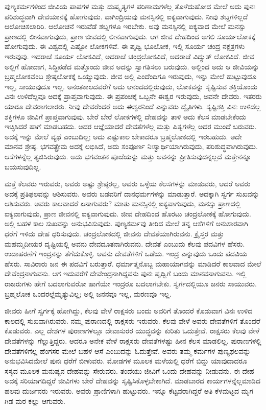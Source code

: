 ಪುಣ್ಯಕರ್ಮಗಳಿಂದ ಜೀವಿಯ ಪಾಪಗಳ ಮತ್ತು ದುಷ್ಕೃತ್ಯಗಳ ಪರಿಣಾಮಗಳೆಲ್ಲ ತೊಳೆದುಹೋದ ಮೇಲೆ ಅದು ಪುನಃ ಪರಿಶುದ್ಧವಾಗಿ ದೇವಯಾನಕ್ಕೆ ಹೋಗುವುದು. ವಾಗಿಂದ್ರಿಯವು ಮನಸ್ಸಿನಲ್ಲಿ ಐಕ್ಯವಾಗುವುದು. ನೀವು ಶಬ್ದಗಳಿಲ್ಲದೆ ಆಲೋಚಿಸಲಾರಿರಿ. ಆಲೋಚನೆ ಇರುವೆಡೆ ಶಬ್ದಗಳೂ ಇರಬೇಕು. ಅವು ಮನಸ್ಸಿನಲ್ಲಿ ಐಕ್ಯವಾದ ಮೇಲೆ ಮನಸ್ಸು ಪ್ರಾಣದಲ್ಲಿ ಲೀನವಾಗುವುದು, ಪ್ರಾಣ ಜೀವದಲ್ಲಿ ಲೀನವಾಗುವುದು. ಆಗ ಜೀವ ದೇಹದಿಂದ ಅಗಲಿ ಸೂರ್ಯಲೋಕಕ್ಕೆ ಹೋಗುವುದು. ಈ ವಿಶ್ವದಲ್ಲಿ ಎಷ್ಟೋ ಲೋಕಗಳಿವೆ. ಈ ಪೃಥ್ವಿ ಭೂಲೋಕ, ಇಲ್ಲಿ ಸೂರ್ಯ ಚಂದ್ರ ನಕ್ಷತ್ರಗಳು ಇರುವುವು. ಇದರಾಚೆ ಸೂರ್ಯ ಲೋಕವಿದೆ, ಅದರಾಚೆ ಚಂದ್ರಲೋಕವಿದೆ, ಅದರಾಚೆ ವಿದ್ಯುತ್​ ಲೋಕವಿದೆ. ಜೀವ ಅಲ್ಲಿಗೆ ಹೋದಾಗ, ಸಿದ್ಧಿಪಡೆದ ಮತ್ತೊಂದು ಜೀವ ಅದನ್ನು ಸ್ವಾಗತಿಸಲು ಬರುವುದು. ಅಲ್ಲಿಂದ ಅದು ಆ ಜೀವಿಯನ್ನು ಬ್ರಹ್ಮಲೋಕವೆಂಬ ಶ್ರೇಷ್ಠಲೋಕಕ್ಕೆ ಒಯ್ಯುವುದು. ಜೀವ ಅಲ್ಲಿ ಎಂದೆಂದಿಗೂ ಇರುವುದು, ಇನ್ನು ಮೇಲೆ ಹುಟ್ಟುವುದೂ ಇಲ್ಲ, ಸಾಯುವುದೂ ಇಲ್ಲ. ಅನಂತಕಾಲದವರೆಗೆ ಅದು ಆನಂದದಲ್ಲಿರುವುದು, ಲೋಕವನ್ನು ಸೃಷ್ಟಿಸುವ ಶಕ್ತಿಯೊಂದು ವಿನಃ ಉಳಿದೆಲ್ಲವೂ ಅದಕ್ಕೆ ಪ್ರಾಪ್ತವಾಗುವುದು. ಈ ಪ್ರಪಂಚಕ್ಕೆ ಒಬ್ಬನೇ ಈಶ್ವರ ಇರುವುದು, ಅವನೇ ದೇವರು. ಇತರರು ಯಾರೂ ದೇವರಾಗಲಾರರು. ನೀವು ದೇವರೆಂದರೆ ಅದು ಈಶ್ವರನಿಂದೆ ಎನ್ನುವರು ದ್ವೈತಿಗಳು. ಸೃಷ್ಟಿಶಕ್ತಿ ವಿನಃ ಉಳಿದೆಲ್ಲ ಶಕ್ತಿಗಳೂ ಜೀವಿಗೆ ಪ್ರಾಪ್ತವಾಗುವುವು. ಬೇರೆ ಬೇರೆ ಲೋಕಗಳಲ್ಲಿ ದೇಹವನ್ನು ತಾಳಿ ಅದು ಕೆಲಸ ಮಾಡಬೇಕೆಂದು ಇಚ್ಛಿಸಿದರೆ ಹಾಗೆ ಮಾಡಬಹದು. ಅದರ ಆಜ್ಞೆಯಾದರೆ ದೇವತೆಗಳೆಲ್ಲ ಮತ್ತು ಪಿತೃಗಳೆಲ್ಲ ಅದರ ಮುಂದೆ ಬರುವರು. ಅದಕ್ಕೆ ಇನ್ನು ಮೇಲೆ ವ್ಯಥೆ ಎಂಬುದಿಲ್ಲ; ಅದು ಎಷ್ಟುಕಾಲ ಬೇಕಾದರೂ ಬ್ರಹ್ಮಲೋಕದಲ್ಲಿ ಇರಬಹುದು. ಅದೇ ಮಾನವ ಶ್ರೇಷ್ಠ. ಭಗವತ್ಪ್ರೇಮ ಅದಕ್ಕೆ ಲಭಿಸಿದೆ, ಅದು ಸಂಪೂರ್ಣ ನಿಃಸ್ವಾರ್ಥಿಯಾಗಿರುವುದು, ಪರಿಶುದ್ಧವಾಗಿರುವುದು. ಆಸೆಗಳನ್ನೆಲ್ಲ ತ್ಯಜಿಸಿರುವುದು. ಅದು ಭಗವಂತನ ಪೂಜೆಯನ್ನು ಮತ್ತು ಅವನನ್ನು ಪ್ರೀತಿಸುವುದನ್ನಲ್ಲದೆ ಮತ್ತೇನನ್ನೂ ಬಯಸುವುದಿಲ್ಲ.

ಮತ್ತೆ ಕೆಲವರು ಇರುವರು, ಅವರು ಅಷ್ಟು ಶ್ರೇಷ್ಠರಲ್ಲ, ಅವರು ಒಳ್ಳೆಯ ಕೆಲಸಗಳನ್ನು ಮಾಡುವರು, ಆದರೆ ಅವರು ಅದಕ್ಕೆ ಪ್ರತಿಫಲವನ್ನು ಆಶಿಸುವರು. ಅವರು ಬಡವರಿಗೆ ದಾನಧರ್ಮಗಳನ್ನು ಮಾಡುತ್ತಾರೆ. ಅದಕ್ಕಾಗಿ ಸ್ವರ್ಗ ಸುಖವನ್ನು ಆಶಿಸುವರು. ಅವರು ಕಾಲವಾದರೆ ಏನಾಗುವರು? ಮಾತು ಮನಸ್ಸಿನಲ್ಲಿ ಐಕ್ಯವಾಗುವುದು, ಮನಸ್ಸು ಪ್ರಾಣದಲ್ಲಿ ಐಕ್ಯವಾಗುವುದು, ಪ್ರಾಣ ಜೀವನಲ್ಲಿ ಐಕ್ಯವಾಗುವುದು. ಜೀವ ದೇಹದಿಂದ ಹೊರಟು ಚಂದ್ರಲೋಕಕ್ಕೆ ಹೋಗುವುದು. ಅಲ್ಲಿ ಬಹಳ ಕಾಲ ಸುಖವನ್ನು ಅನುಭವಿಸುವುದು. ಪುಣ್ಯಕರ್ಮವು ತೀರಿದ ಮೇಲೆ ತನ್ನ ಆಸೆಗಳಿಗೆ ಅನುಸಾರವಾಗಿ ಧರೆಗೆ ಇಳಿದು ದೇಹ ಧರಿಸುವುದು. ಚಂದ್ರಲೋಕದಲ್ಲಿ ಜೀವನು ದೇವತೆಯಾಗಿರುವನು. ಕ್ರೈಸ್ತರ ಮತ್ತು ಮಹಮ್ಮದೀಯರ ದೃಷ್ಟಿಯಲ್ಲಿ ಅವನು ದೇವದೂತನಾಗಿರುವನು. ದೇವತೆ ಎಂಬುದು ಕೆಲವು ಪದವಿಗಳ ಹೆಸರು. ಉದಾಹರಣೆಗೆ ಇಂದ್ರನನ್ನು ತೆಗೆದುಕೊಳ್ಳಿ. ಅವನು ದೇವತೆಗಳಿಗೆ ಒಡೆಯ. ಇಂದ್ರ ಎನ್ನುವುದು ಒಂದು ಪದವಿಯ ಹೆಸರು. ಸಾವಿರಾರು ಜನ ಈ ಪದವಿಗೆ ಬರುತ್ತಾರೆ. ಧರ್ಮಾತ್ಮನೊಬ್ಬ ಮಹಾಯಾಗವನ್ನು ಮಾಡಿದರೆ ಕಾಲವಾದ ಮೇಲೆ ದೇವೆಂದ್ರನಾಗುವನು. ಆಗ ಇದುವರೆಗೆ ದೇವೇಂದ್ರನಾಗಿದ್ದವನು ಪುನಃ ಪೃಥ್ವಿಗೆ ಬಂದು ಮಾನವನಾಗುವನು. ಇಲ್ಲಿ ರಾಜರುಗಳು ಹೇಗೆ ಬದಲಾಗುವರೋ ಹಾಗೆಯೇ ಇಂದ್ರರೂ ಬದಲಾಗಬೇಕು. ಸ್ವರ್ಗದಲ್ಲಿಯೂ ಜನರು ಸಾಯುವರು. ಬ್ರಹ್ಮಲೋಕ ಒಂದರಲ್ಲೆ\break ಮೃತ್ಯುವಿಲ್ಲ; ಅಲ್ಲಿ ಜನನವೂ ಇಲ್ಲ, ಮರಣವೂ ಇಲ್ಲ.

ಜೀವರು ಹೀಗೆ ಸ್ವರ್ಗಕ್ಕೆ ಹೋಗಿದ್ದು, ಕೆಲವು ವೇಳೆ ರಾಕ್ಷಸರು ಬಂದು ಅವರಿಗೆ ತೊಂದರೆ ಕೊಡುವಾಗ ವಿನಃ ಉಳಿದ ಕಾಲದಲ್ಲಿ ಸುಖವಾಗಿರುವರು. ನಮ್ಮ ಪುರಾಣದಲ್ಲಿ ರಾಕ್ಷಸರು ಇರುವರು. ಕೆಲವು ವೇಳೆ ಅವರು ದೇವತೆಗಳಿಗೆ ತೊಂದರೆ ಕೊಡುವರು. ಎಲ್ಲ ದೇಶಗಳ ಪುರಾಣಗಳಲ್ಲೂ ದೇವಾಸುರರ ಯುದ್ಧವನ್ನು ಕುರಿತು ಓದುತ್ತೇವೆ. ರಾಕ್ಷಸರು ಕೆಲವು ವೇಳೆ ದೇವತೆಗಳನ್ನು ಗೆಲ್ಲುತ್ತಿದ್ದರು. ಆದರೂ ಅನೇಕ ವೇಳೆ ರಾಕ್ಷಸರು ದೇವತೆಗಳಷ್ಟು ಹೀನ ಕೆಲಸ ಮಾಡಲಿಲ್ಲ. ಪುರಾಣಗಳಲ್ಲಿ ದೇವತೆಗಳಿಗೆಲ್ಲ ಹೆಂಗಸರ ಮೇಲೆ ಬಹಳ ಆಸೆ ಎಂಬುದನ್ನು ಓದುತ್ತೇವೆ. ಅವರು ತಮ್ಮ ಕರ್ಮಗಳ ಪುಣ್ಯಫಲವನ್ನು ಅನುಭವಿಸಿದ\break ಮೇಲೆ ಪುನಃ ಧರೆಗೆ ಬೀಳುವರು. ಮೋಡಗಳ ಮೂಲಕ ಮಳೆಯಲ್ಲಿ ಧರೆಗೆ ಬಿದ್ದು ಯಾವುದಾದರೂ ಸಸ್ಯದ ಮೂಲಕ ಮನುಷ್ಯನ ದೇಹವನ್ನು ಸೇರುವರು. ತಂದೆಯು ಜೀವಿಗೆ ಒಂದು ದೇಹವನ್ನು ನೀಡುವನು. ಈ ದೇಹ ಅದಕ್ಕೆ ಸರಿಯಾಗದಿದ್ದರೆ ಜೀವಿ\break ಗಳು ಬೇರೆ ದೇಹವನ್ನು ಸೃಷ್ಟಿಸಿಕೊಳ್ಳಬೇಕಾಗಿದೆ. ಮಾಡಬಾರದ ಕಾರ್ಯಗಳನ್ನೆಲ್ಲ\break ಮಾಡಿದ ಹಲವು ದುರ್ಜನರು ಇರುವರು. ಅವರು ಪ್ರಾಣಿಗಳಾಗಿ ಹುಟ್ಟುವರು. ಇನ್ನೂ ಕೆಟ್ಟವರಾಗಿದ್ದರೆ ಅತಿ ಕೆಳಮಟ್ಟದ ಮೃಗ ಗಿಡ ಮರ ಕಲ್ಲು ಆಗುವರು.

